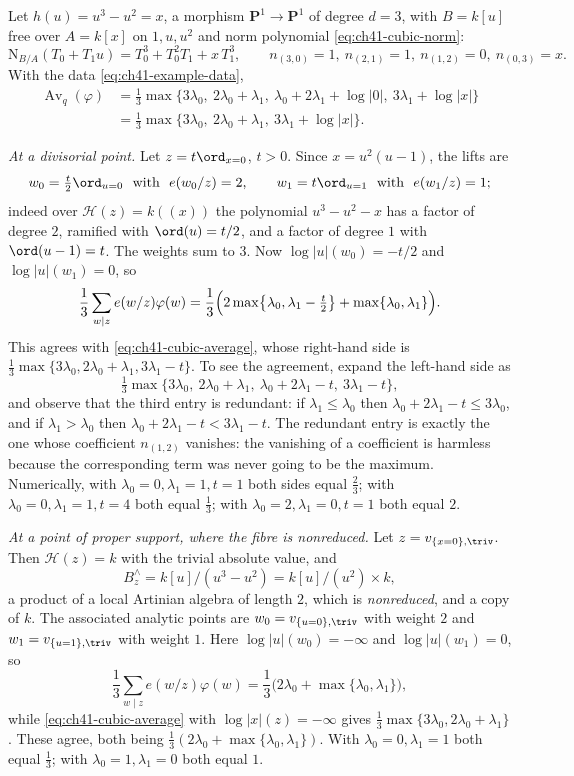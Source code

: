 \begin{example}
\label{ex:ch41-nonreduced-fibre}
Let $h(u)=u^3-u^2=x$, a morphism $\mathbf P^1\to\mathbf P^1$ of degree
$d=3$, with $B=k[u]$ free over $A=k[x]$ on $1,u,u^2$ and norm
polynomial \eqref{eq:ch41-cubic-norm}:
\[
 \mathrm N_{B/A}(T_0+T_1u)=T_0^3+T_0^2T_1+x\,T_1^3,
 \qquad
 n_{(3,0)}=1,\ n_{(2,1)}=1,\ n_{(1,2)}=0,\ n_{(0,3)}=x .
\]
With the data \eqref{eq:ch41-example-data},
\[
 \begin{aligned}
 \operatorname{Av}_q(\varphi)
 &=\tfrac13\max\bigl\{3\lambda_0,\ 2\lambda_0+\lambda_1,\
 \lambda_0+2\lambda_1+\log|0|,\ 3\lambda_1+\log|x|\bigr\}
 \\
 &=\tfrac13\max\bigl\{3\lambda_0,\ 2\lambda_0+\lambda_1,\
 3\lambda_1+\log|x|\bigr\}.
 \end{aligned}
\tag{41.36}\label{eq:ch41-cubic-average}
\]

\emph{At a divisorial point.}  Let $z=t\ord_{x=0}$, $t>0$.  Since
$x=u^2(u-1)$, the lifts are
\[
 w_0=\tfrac t2\ord_{u=0}\ \ \text{with}\ \ e(w_0/z)=2,
 \qquad
 w_1=t\ord_{u=1}\ \ \text{with}\ \ e(w_1/z)=1 ;
\]
indeed over $\mathcal H(z)=k((x))$ the polynomial $u^3-u^2-x$ has a
factor of degree $2$, ramified with $\ord(u)=t/2$, and a factor of
degree $1$ with $\ord(u-1)=t$.  The weights sum to $3$.  Now
$\log|u|(w_0)=-t/2$ and $\log|u|(w_1)=0$, so
\[
 \frac13\sum_{w\mid z}e(w/z)\varphi(w)
 =\frac13\Bigl(2\max\bigl\{\lambda_0,\lambda_1-\tfrac t2\bigr\}
 +\max\{\lambda_0,\lambda_1\}\Bigr).
\]
This agrees with \eqref{eq:ch41-cubic-average}, whose right-hand side is
$\frac13\max\{3\lambda_0,2\lambda_0+\lambda_1,3\lambda_1-t\}$.  To see the
agreement, expand the left-hand side as
\[
 \tfrac13\max\bigl\{3\lambda_0,\ 2\lambda_0+\lambda_1,\
 \lambda_0+2\lambda_1-t,\ 3\lambda_1-t\bigr\},
\]
and observe that the third entry is redundant: if $\lambda_1\le\lambda_0$
then $\lambda_0+2\lambda_1-t\le3\lambda_0$, and if
$\lambda_1>\lambda_0$ then $\lambda_0+2\lambda_1-t<3\lambda_1-t$.  The
redundant entry is exactly the one whose coefficient
$n_{(1,2)}$ vanishes: the vanishing of a coefficient is harmless because
the corresponding term was never going to be the maximum.  Numerically,
with $\lambda_0=0,\lambda_1=1,t=1$ both sides equal $\tfrac23$; with
$\lambda_0=0,\lambda_1=1,t=4$ both equal $\tfrac13$; with
$\lambda_0=2,\lambda_1=0,t=1$ both equal $2$.

\emph{At a point of proper support, where the fibre is nonreduced.}  Let
$z=v_{\{x=0\},\triv}$.  Then $\mathcal H(z)=k$ with the trivial absolute
value, and
\[
 B_z^{\wedge}=k[u]/(u^3-u^2)=k[u]/(u^2)\times k ,
\]
a product of a local Artinian algebra of length $2$, which is
\emph{nonreduced}, and a copy of $k$.  The associated analytic points are
$w_0=v_{\{u=0\},\triv}$ with weight $2$ and
$w_1=v_{\{u=1\},\triv}$ with weight $1$.  Here
$\log|u|(w_0)=-\infty$ and $\log|u|(w_1)=0$, so
\[
 \frac13\sum_{w\mid z}e(w/z)\varphi(w)
 =\frac13\bigl(2\lambda_0+\max\{\lambda_0,\lambda_1\}\bigr),
\]
while \eqref{eq:ch41-cubic-average} with $\log|x|(z)=-\infty$ gives
$\frac13\max\{3\lambda_0,2\lambda_0+\lambda_1\}$.  These agree, both
being $\frac13(2\lambda_0+\max\{\lambda_0,\lambda_1\})$.  With
$\lambda_0=0,\lambda_1=1$ both equal $\tfrac13$; with
$\lambda_0=1,\lambda_1=0$ both equal $1$.


\end{example}
